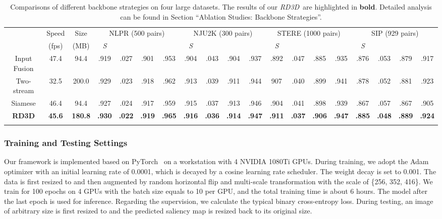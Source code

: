 \documentclass[letterpaper]{article}
\def\ourmodel{\emph{RD3D}}
\begin{document}
\begin{table*}[t]
  \centering
  \footnotesize
\caption{\small Comparisons of different backbone strategies on four large datasets. The results of our \ourmodel~are highlighted in \textbf{bold}. Detailed analysis can be found in Section ``Ablation Studies: Backbone Strategies''.}\vspace{-0.5cm}
  \vspace{8pt}
\scriptsize
  \renewcommand{\arraystretch}{0.87}
  \renewcommand{\tabcolsep}{0.35mm}
\begin{tabular}{c|c|c|cccc|cccc|cccc|cccc}
  \Xhline{0.8pt}
  \multirow{2}{*}{Architecture}& Speed &Size  & \multicolumn{4}{c|}{NLPR (500 pairs)} & \multicolumn{4}{c|}{NJU2K (300 pairs)} & \multicolumn{4}{c|}{STERE (1000 pairs)}  & \multicolumn{4}{c}{SIP (929 pairs)}\\
  \cline{4-19}
   &(fps)&(MB) &\itshape{S}  &  &  & & \itshape{S} &  &  & & \itshape{S} &  &  &&\itshape{S} &  &  &\\
  \Xhline{0.8pt}
   Input Fusion &47.4 &94.4 &.919 &.027 &.901 &.953 &.904 &.043 &.904 &.937 &.892 &.047 &.885 &.935 & .876 &.053 &.879 &.917 \\
   Two-stream &32.5 &200.0 &.929 &.023 &.918 &.962 &.913 &.039 &.911 &.944 & 907 &.040 &.899 &.941  &.878 &.052 &.881 &.923\\
   Siamese  &46.4 &94.4 & .927 &.024 &.917 &.959 &.915 &.037 &.913 &.946 &.904 &.041 &.898 &.939 &.867 &.057 &.867 &.905 \\
   \textbf{RD3D} &\textbf{45.6} & \textbf{180.8} &\textbf{.930} &\textbf{.022} &\textbf{.919} &\textbf{.965} &\textbf{.916} &\textbf{.036} &\textbf{.914} &\textbf{.947} &\textbf{.911}  &\textbf{.037} &\textbf{.906} &\textbf{.947} &\textbf{.885} &\textbf{.048} &\textbf{.889} &\textbf{.924} \\
  \Xhline{0.8pt}
  \end{tabular}
  \label{Tab4:ablation-withother}
  \vspace{-5pt}
\end{table*}

\subsubsection{Training and Testing Settings}
Our framework is implemented based on PyTorch~\cite{paszke2019pytorch} on a workstation with 4 NVIDIA 1080Ti GPUs. During training, we adopt the Adam optimizer with an initial learning rate of 0.0001, which is decayed by a cosine learning rate scheduler. The weight decay is set to 0.001. The data is first resized to  and then augmented by random horizontal flip and multi-scale transformation with the scale of \{256, 352, 416\}. We train for 100 epochs on 4 GPUs with the batch size equals to 10 per GPU, and the total training time is about 6 hours. The model after the last epoch is used for inference. Regarding the supervision, we calculate the typical binary cross-entropy loss. During testing, an image of arbitrary size is first resized to  and the predicted saliency map is resized back to its original size.
\end{document}
